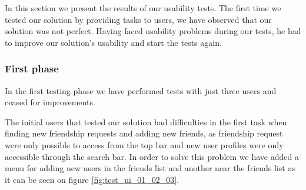 In this section we present the results of our usability tests. The first time we tested our solution by providing tasks to users, we have observed that our solution was not perfect. Having faced usability problems during our tests, he had to improve our solution's usability and start the tests again.

  \subsubsection {First phase}

In the first testing phase we have performed tests with just three users and ceased for improvements. 

The initial users that tested our solution had difficulties in the first task when finding new friendship requests and adding new friends, as friendship request were only possible to access from the top bar and new user profiles were only accessible through the search bar. In order to solve this problem we have added a menu for adding new users in the friends list and another near the friends list as it can be seen on figure \ref{fig:test_ui_01_02_03}.


